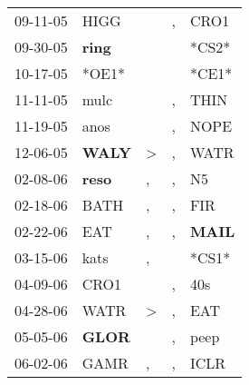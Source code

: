 \begin{supertabular}{p{0.07\textwidth}p{0.06\textwidth}p{0.02\textwidth}p{0.02\textwidth}p{0.06\textwidth}}
          09-11-05\textsuperscript{} &           HIGG\textsuperscript{} &                  &                , &           CRO1\textsuperscript{} \\
          09-30-05\textsuperscript{} &  \textbf{ring\textsuperscript{}} &                  &                  &                            *CS2* \\
          10-17-05\textsuperscript{} &                            *OE1* &                  &                  &                            *CE1* \\
          11-11-05\textsuperscript{} &           mulc\textsuperscript{} &                  &                , &           THIN\textsuperscript{} \\
          11-19-05\textsuperscript{} &           anos\textsuperscript{} &                  &                , &           NOPE\textsuperscript{} \\
          12-06-05\textsuperscript{} &  \textbf{WALY\textsuperscript{}} &     \textgreater &                , &           WATR\textsuperscript{} \\
          02-08-06\textsuperscript{} &  \textbf{reso\textsuperscript{}} &                , &                , &             N5\textsuperscript{} \\
          02-18-06\textsuperscript{} &           BATH\textsuperscript{} &                , &                , &            FIR\textsuperscript{} \\
          02-22-06\textsuperscript{} &            EAT\textsuperscript{} &                , &                , &  \textbf{MAIL\textsuperscript{}} \\
          03-15-06\textsuperscript{} &           kats\textsuperscript{} &                , &                  &                            *CS1* \\
          04-09-06\textsuperscript{} &           CRO1\textsuperscript{} &                  &                , &            40s\textsuperscript{} \\
          04-28-06\textsuperscript{} &           WATR\textsuperscript{} &     \textgreater &                , &            EAT\textsuperscript{} \\
          05-05-06\textsuperscript{} &  \textbf{GLOR\textsuperscript{}} &                  &                , &           peep\textsuperscript{} \\
          06-02-06\textsuperscript{} &           GAMR\textsuperscript{} &                , &                , &           ICLR\textsuperscript{} \\

\end{supertabular}
